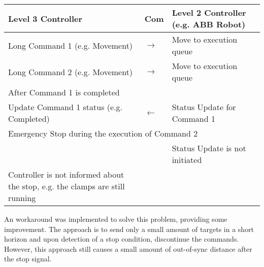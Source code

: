 \begin{table}[H]
\begin{adjustbox}{max width=\textwidth}
\begin{tabular}{p{7.04cm}p{1.67cm}p{7.17cm}}
\hline
\multicolumn{1}{|p{7.04cm}}{{\footnotesize \textbf{Level 3 Controller}}} & 
\multicolumn{1}{|p{1.67cm}}{{\footnotesize \textbf{Com}}} & 
\multicolumn{1}{|p{7.17cm}|}{{\footnotesize \textbf{Level 2 Controller (e.g. ABB Robot)}}} \\ 
\hline
\multicolumn{1}{|p{7.04cm}}{{\footnotesize Long Command 1 (e.g. Movement)}} & 
\multicolumn{1}{|p{1.67cm}}{\centering
{\footnotesize $\rightarrow$}} & 
\multicolumn{1}{|p{7.17cm}|}{{\footnotesize Move to execution queue}} \\ 
\hline
\multicolumn{1}{|p{7.04cm}}{{\footnotesize Long Command 2 (e.g. Movement)}} & 
\multicolumn{1}{|p{1.67cm}}{\centering
{\footnotesize $\rightarrow$}} & 
\multicolumn{1}{|p{7.17cm}|}{{\footnotesize Move to execution queue}} \\ 
\hline
\multicolumn{3}{|p{15.87cm}|}{{\footnotesize After Command 1 is completed}} \\ 
\hline
\multicolumn{1}{|p{7.04cm}}{{\footnotesize Update Command 1 status (e.g. Completed)}} & 
\multicolumn{1}{|p{1.67cm}}{\centering
{\footnotesize $\leftarrow$}} & 
\multicolumn{1}{|p{7.17cm}|}{{\footnotesize Status Update for Command 1}} \\ 
\hline
\multicolumn{3}{|p{15.87cm}|}{{\footnotesize Emergency Stop during the execution of Command 2}} \\ 
\hline
\multicolumn{1}{|p{7.04cm}}{} & 
\multicolumn{1}{|p{1.67cm}}{} & 
\multicolumn{1}{|p{7.17cm}|}{{\footnotesize Status Update is not initiated}} \\ 
\hline
\multicolumn{1}{|p{7.04cm}}{{\footnotesize Controller is not informed about the stop, e.g. the clamps are still running}} & 
\multicolumn{1}{|p{1.67cm}}{} & 
\multicolumn{1}{|p{7.17cm}|}{} \\ 
\hline
\end{tabular}
\end{adjustbox}
\end{table}
\vspace{4\baselineskip}
An workaround was implemented to solve this problem, providing some improvement. The approach is to send only a small amount of targets in a short horizon and upon detection of a stop condition, discontinue the commands. However, this approach still causes a small amount of out-of-sync distance after the stop signal. 

